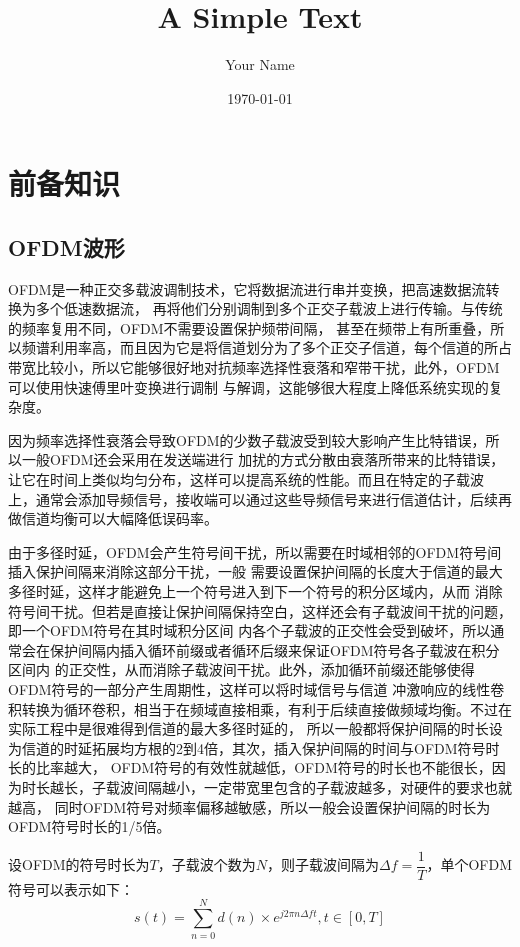 \documentclass[12pt, a4paper, oneside]{ctexart}
\title{A Simple Text}
\author{Your Name}
\date{\today}
\begin{document}
\maketitle

\section{\heiti{} 前备知识}
\subsection*{\heiti{} OFDM波形}
\songti OFDM是一种正交多载波调制技术，它将数据流进行串并变换，把高速数据流转换为多个低速数据流，
再将他们分别调制到多个正交子载波上进行传输。与传统的频率复用不同，OFDM不需要设置保护频带间隔，
甚至在频带上有所重叠，所以频谱利用率高，而且因为它是将信道划分为了多个正交子信道，每个信道的所占
带宽比较小，所以它能够很好地对抗频率选择性衰落和窄带干扰，此外，OFDM可以使用快速傅里叶变换进行调制
与解调，这能够很大程度上降低系统实现的复杂度。

因为频率选择性衰落会导致OFDM的少数子载波受到较大影响产生比特错误，所以一般OFDM还会采用在发送端进行
加扰的方式分散由衰落所带来的比特错误，让它在时间上类似均匀分布，这样可以提高系统的性能。而且在特定的子载波
上，通常会添加导频信号，接收端可以通过这些导频信号来进行信道估计，后续再做信道均衡可以大幅降低误码率。

由于多径时延，OFDM会产生符号间干扰，所以需要在时域相邻的OFDM符号间插入保护间隔来消除这部分干扰，一般
需要设置保护间隔的长度大于信道的最大多径时延，这样才能避免上一个符号进入到下一个符号的积分区域内，从而
消除符号间干扰。但若是直接让保护间隔保持空白，这样还会有子载波间干扰的问题，即一个OFDM符号在其时域积分区间
内各个子载波的正交性会受到破坏，所以通常会在保护间隔内插入循环前缀或者循环后缀来保证OFDM符号各子载波在积分区间内
的正交性，从而消除子载波间干扰。此外，添加循环前缀还能够使得OFDM符号的一部分产生周期性，这样可以将时域信号与信道
冲激响应的线性卷积转换为循环卷积，相当于在频域直接相乘，有利于后续直接做频域均衡。不过在实际工程中是很难得到信道的最大多径时延的，
所以一般都将保护间隔的时长设为信道的时延拓展均方根的2到4倍，其次，插入保护间隔的时间与OFDM符号时长的比率越大，
OFDM符号的有效性就越低，OFDM符号的时长也不能很长，因为时长越长，子载波间隔越小，一定带宽里包含的子载波越多，对硬件的要求也就越高，
同时OFDM符号对频率偏移越敏感，所以一般会设置保护间隔的时长为OFDM符号时长的1/5倍。

设OFDM的符号时长为$T$，子载波个数为$N$，则子载波间隔为$\Delta f = \dfrac{1}{T} $，单个OFDM符号可以表示如下：
\[
    s(t) = \sum_{n=0}^{N} d(n)\times e^{j2\pi n\Delta ft},t\in [0,T]
\]
\end{document}
